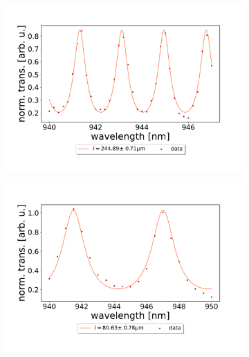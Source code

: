 \begin{figure}[h!]
\begin{subfigure}[b]{0.49\textwidth}
    \end{subfigure}
    \begin{subfigure}[b]{0.49\textwidth}
        \includegraphics[width=\textwidth]{figures/results/double fano fits/20250326/251um_M3:M5_FSR_scan.pdf}
        \caption{}
        \label{fig:251um_M3:M5_FSR_scan}
    \end{subfigure}
    \begin{subfigure}[b]{0.49\textwidth}
        \includegraphics[width=\textwidth]{figures/results/double fano fits/20250326/83um_M3:M5_FSR_scan.pdf}
        \caption{}
        \label{fig:83um_M3:M5_FSR_scan}
    \end{subfigure}
    \begin{subfigure}[b]{0.49\textwidth}

\end{subfigure}
\end{figure}
